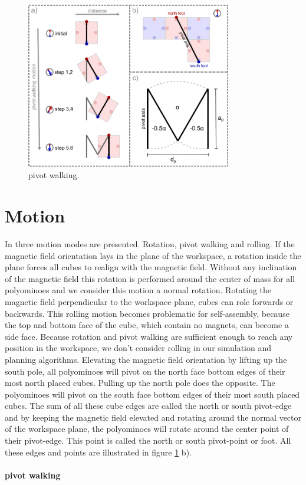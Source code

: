 \begin{figure}
	\centering
	\includegraphics[width=0.80\textwidth]{figures/pivot_walking.pdf}
	\caption{pivot walking.}
	\label{fig:pivot_walking}
\end{figure}

\section{Motion}
In \cite{Bhattacharjee2022} three motion modes are presented. Rotation, pivot walking and rolling.
If the magnetic field orientation lays in the plane of the workspace, a rotation inside the plane forces all cubes to realign with the magnetic field.
Without any inclination of the magnetic field this rotation is performed around the center of mass for all polyominoes and we consider this motion a normal rotation.
Rotating the magnetic field perpendicular to the workspace plane, cubes can role forwards or backwards.
This rolling motion becomes problematic for self-assembly, because the top and bottom face of the cube, which contain no magnets, can become a side face.
Because rotation and pivot walking are sufficient enough to reach any position in the workspace, we don't consider rolling in our simulation and planning algorithms.
Elevating the magnetic field orientation by lifting up the south pole, all polyominoes will pivot on the north face bottom edges of their most north placed cubes.
Pulling up the north pole does the opposite. The polyominoes will pivot on the south face bottom edges of their most south placed cubes.
The sum of all these cube edges are called the north or south pivot-edge and by keeping the magnetic field elevated and rotating around the normal vector of the workspace plane, the polyominoes will rotate around the center point of their pivot-edge.
This point is called the north or south pivot-point or foot.
All these edges and points are illustrated in figure \ref{fig:pivot_walking} b).

\paragraph{pivot walking}



